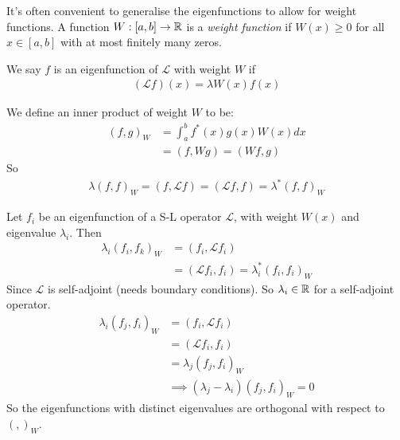 \documentclass[a4paper]{article}
\begin{document}
It's often convenient to generalise the eigenfunctions to allow for weight functions. A function $W:\left[a,b\right] \to \mathbb{R}$ is a \emph{weight function} if $W\left(x\right) \geq 0 $ for all $x \in \left[a,b\right]$ with at most finitely many zeros.

We say $f$ is an eigenfunction of $\mathcal{L}$ with weight $W$ if
\begin{equation*}
\begin{aligned}
\left(\mathcal{L}f\right)\left(x\right) = \lambda W\left(x\right) f\left(x\right)
\end{aligned}
\end{equation*}

We define an inner product of weight $W$ to be:
\begin{equation*}
\begin{aligned}
\left(f,g\right)_W &= \int_a^b f^*\left(x\right) g\left(x\right) W\left(x\right) dx\\
&= \left(f,Wg\right) = \left(Wf,g\right)
\end{aligned}
\end{equation*}
So
\begin{equation*}
\begin{aligned}
\lambda \left(f,f\right)_W = \left(f,\mathcal{L}f\right) = \left(\mathcal{L}f,f\right) = \lambda^* \left(f,f\right)_W
\end{aligned}
\end{equation*}

Let $f_i$ be an eigenfunction of a S-L operator $\mathcal{L}$, with weight $W\left(x\right)$ and eigenvalue $\lambda_i$. Then
\begin{equation*}
\begin{aligned}
\lambda_i \left(f_i,f_k\right)_W &= \left(f_i,\mathcal{L}f_i\right)\\
&= \left(\mathcal{L}f_i,f_i\right) = \lambda_i^* \left(f_i,f_i\right)_W
\end{aligned}
\end{equation*}
Since $\mathcal{L}$ is self-adjoint (needs boundary conditions). So $\lambda_i \in \mathbb{R}$ for a self-adjoint operator.
\begin{equation*}
\begin{aligned}
\lambda_i \left(f_j,f_i\right)_W &= \left(f_i,\mathcal{L}f_i\right)\\
&=\left(\mathcal{L} f_i,f_i\right) \\
&=\lambda_j \left(f_j,f_i\right)_W\\
&\implies \left(\lambda_j - \lambda_i\right) \left(f_j,f_i\right)_W = 0
\end{aligned}
\end{equation*}
So the eigenfunctions with distinct eigenvalues are orthogonal with respect to $\left(,\right)_W$.
\end{document}
